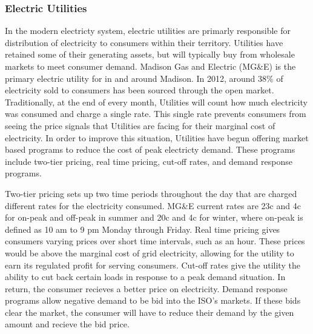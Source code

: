 \subsubsection{Electric Utilities}
In the modern electricty system, electric utilities are primarly responsible for distribution of electricity to consumers within their territory.  Utilities have retained some of their generating assets, but will typically buy from wholesale markets to meet consumer demand.  Madison Gas and Electric (MG\&E) is the primary electric utility for in and around Madison.  In 2012, around 38\% of electricity sold to consumers has been sourced through the open market.  Traditionally, at the end of every month, Utilities will count how much electricity was consumed and charge a single rate.  This single rate prevents consumers from seeing the price signals that Utilities are facing for their marginal cost of electricity.  In order to improve this situation, Utilities have begun offering market based programs to reduce the cost of peak electricty demand.  These programs include two-tier pricing, real time pricing, cut-off rates, and demand response programs.  

	Two-tier pricing sets up two time periods throughout the day that are charged different rates for the electricity consumed.  MG\&E current rates are 23c and 4c for on-peak and off-peak in summer and 20c and 4c for winter, where on-peak is defined as 10 am to 9 pm Monday through Friday.  Real time pricing gives consumers varying prices over short time intervals, such as an hour.  These prices would be above the marginal cost of grid electricity, allowing for the utility to earn its regulated profit for serving consumers.  Cut-off rates give the utility the ability to cut back certain loads in response to a peak demand situation.  In return, the consumer recieves a better price on electricity.  Demand response programs allow negative demand to be bid into the ISO's markets.  If these bids clear the market, the consumer will have to reduce their demand by the given amount and recieve the bid price.  

